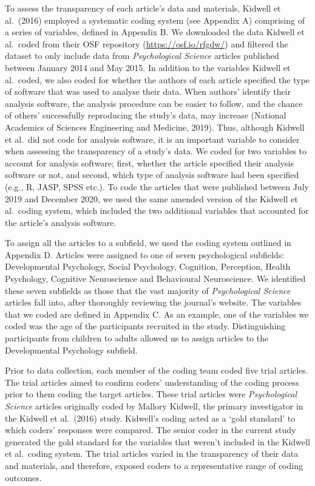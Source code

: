 \documentclass[
  english,
  man,floatsintext]{apa6}
\begin{document}
To assess the transparency of each article's data and materials, Kidwell et al.~(2016) employed a systematic coding system (see Appendix A) comprising of a series of variables, defined in Appendix B. We downloaded the data Kidwell et al.~coded from their OSF repository (\url{https://osf.io/rfgdw/}) and filtered the dataset to only include data from \emph{Psychological Science} articles published between January 2014 and May 2015.
In addition to the variables Kidwell et al.~coded, we also coded for whether the authors of each article specified the type of software that was used to analyse their data. When authors' identify their analysis software, the analysis procedure can be easier to follow, and the chance of others' successfully reproducing the study's data, may increase (National Academics of Sciences Engineering and Medicine, 2019). Thus, although Kidwell et al.~did not code for analysis software, it is an important variable to consider when assessing the transparency of a study's data. We coded for two variables to account for analysis software; first, whether the article specified their analysis software or not, and second, which type of analysis software had been specified (e.g., R, JASP, SPSS etc.).
To code the articles that were published between July 2019 and December 2020, we used the same amended version of the Kidwell et al.~coding system, which included the two additional variables that accounted for the article's analysis software.

To assign all the articles to a subfield, we used the coding system outlined in Appendix D. Articles were assigned to one of seven psychological subfields: Developmental Psychology, Social Psychology, Cognition, Perception, Health Psychology, Cognitive Neuroscience and Behavioural Neuroscience. We identified these seven subfields as those that the vast majority of \emph{Psychological Science} articles fall into, after thoroughly reviewing the journal's website. The variables that we coded are defined in Appendix C. As an example, one of the variables we coded was the age of the participants recruited in the study. Distinguishing participants from children to adults allowed us to assign articles to the Developmental Psychology subfield.

Prior to data collection, each member of the coding team coded five trial articles. The trial articles aimed to confirm coders' understanding of the coding process prior to them coding the target articles. These trial articles were \emph{Psychological Science} articles originally coded by Mallory Kidwell, the primary investigator in the Kidwell et al.~(2016) study. Kidwell's coding acted as a `gold standard' to which coders' responses were compared. The senior coder in the current study generated the gold standard for the variables that weren't included in the Kidwell et al.~coding system. The trial articles varied in the transparency of their data and materials, and therefore, exposed coders to a representative range of coding outcomes.
\end{document}
